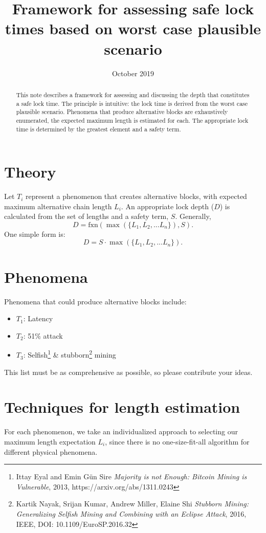 \documentclass{mrl}
\title{Framework for assessing safe lock times based on worst case plausible scenario}
\date{October 2019}
\begin{document}
\vspace{-0.25cm}
\begin{abstract}
This note describes a framework for assessing and discussing the depth that constitutes a safe lock time. The principle is intuitive: the lock time is derived from the worst case plausible scenario. Phenomena that produce alternative blocks are exhaustively enumerated, the expected maximum length is estimated for each. The appropriate lock time is determined by the greatest element and a safety term.
\end{abstract}

\section{Theory} \label{sec_theory}
Let $T_i$ represent a phenomenon that creates alternative blocks, with expected maximum alternative chain length $L_i$. An appropriate lock depth ($D$) is calculated from the set of lengths and a safety term, $S$. Generally,
\begin{equation}D = \mathrm{fxn}(\max(\{L_1, L_2, ... L_n\}), S). \label{D_gen} \end{equation}
One simple form is:
\begin{equation}D = S\cdot\max(\{L_1, L_2, ... L_n\}). \label{D_mult} \end{equation}

\section{Phenomena}
Phenomena that could produce alternative blocks include:
\begin{itemize}
    \item $T_1$: Latency
    \item $T_2$: 51\% attack
    \item $T_3$:  Selfish\footnote{Ittay Eyal and Emin G{\"u}n Sire \emph{Majority is not Enough: Bitcoin Mining is Vulnerable}, 2013, https://arxiv.org/abs/1311.0243} \& stubborn\footnote{Kartik Nayak, Srijan Kumar, Andrew Miller, Elaine Shi \emph{Stubborn Mining: Generalizing Selfish Mining and Combining with an Eclipse Attack}, 2016, IEEE, DOI: 10.1109/EuroSP.2016.32} mining
\end{itemize}

This list must be as comprehensive as possible, so please contribute your ideas.

\section{Techniques for length estimation}
For each phenomenon, we take an individualized approach to selecting our maximum length expectation $L_i$, since there is no one-size-fit-all algorithm for different physical phenomena.
\end{document}

